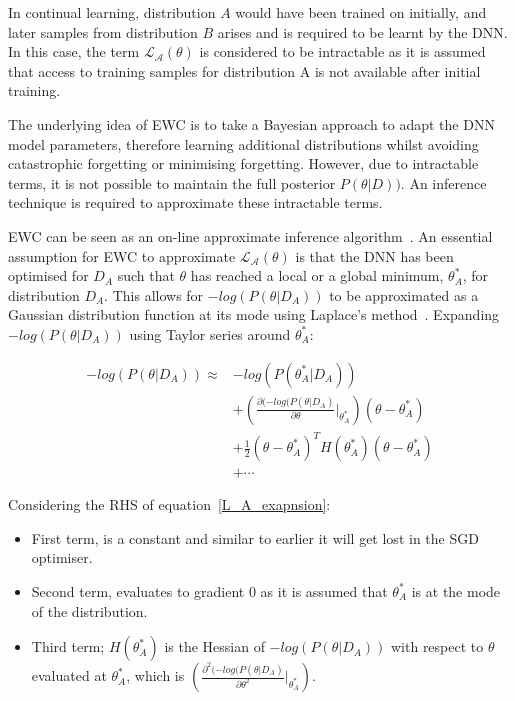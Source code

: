 In continual learning, distribution $A$ would have been trained on initially, and later samples from distribution $B$ arises and is required to be learnt by the DNN.
%
In this case, the term $\mathcal{L_A}(\theta)$ is considered to be intractable as it is assumed that access to training samples for distribution A is not available after initial training.

The underlying idea of EWC is to take a Bayesian approach to adapt the DNN model parameters, therefore learning additional distributions whilst avoiding catastrophic forgetting or minimising forgetting. 
%
However, due to intractable terms, it is not possible to maintain the full posterior $P(\theta|D))$.
%
An inference technique is required to approximate these intractable terms. 

EWC can be seen as an on-line approximate inference algorithm~\cite{Huszar2018}.
%
An essential assumption for EWC to approximate $\mathcal{L_A}(\theta)$ is that the DNN has been optimised for $D_A$ such that $\theta$ has reached a local or a global minimum, $\theta^{*}_{A}$, for distribution $D_A$.
%
This allows for $-log(P(\theta|D_A))$ to be approximated as a Gaussian distribution function at its mode using Laplace's method~\cite{MacKay2003}. 
%
Expanding $-log(P(\theta|D_A))$ using Taylor series around $\theta^{*}_{A}$: 

\begin{equation} \label{L_A_exapnsion}
\begin{split}
    -log(P(\theta|D_A)) \approx & -log(P(\theta^*_A|D_A)) 
    \\
    & + (\frac{\partial(-log(P(\theta|D_A)}{\partial \theta}\vert_{\theta^*_A})(\theta - \theta^*_A) 
    \\
    & + \frac{1}{2}(\theta - \theta^*_A)^{T} H(\theta^*_A)(\theta - \theta^*_A) 
    \\
    & + \cdots
\end{split}
\end{equation}

\noindent Considering the RHS of equation~\ref{L_A_exapnsion}:
\begin{itemize}
    \item First term, is a constant and similar to earlier it will get lost in the SGD optimiser.  
%
    \item Second term, evaluates to gradient 0 as it is assumed that $\theta^*_A$ is at the mode of the distribution. 
%
    \item  Third term; $H(\theta^{*}_{A})$ is the Hessian of $-log(P(\theta|D_A))$ with respect to $\theta$ evaluated at $\theta^*_A$, which is $(\frac{\partial^2(-log(P(\theta|D_A)}{\partial \theta^2}\vert_{\theta^*_A})$.  
\end{itemize}

